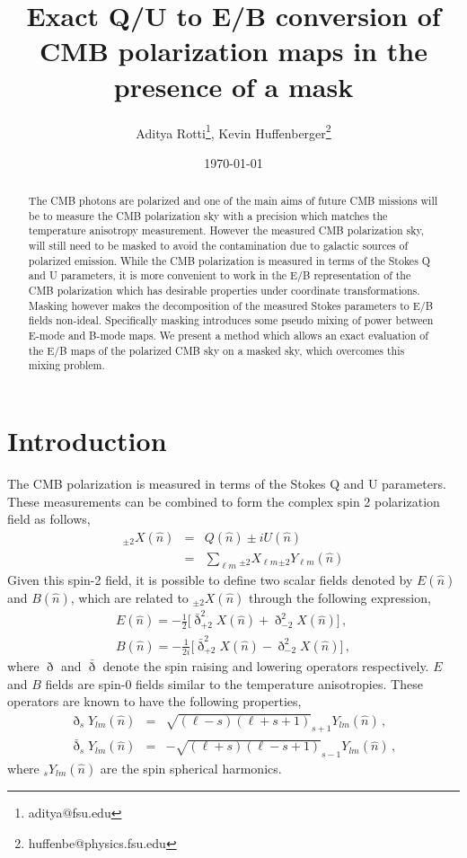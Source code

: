 \documentclass[prd,amsmath,amssymb,floatfix,nofootinbib,preprintnumbers,twocolumn]{revtex4}%
\newcommand{\beqry}{\begin{eqnarray}}
\newcommand{\eeqry}{\end{eqnarray}}
\begin{document}
\title{Exact Q/U to E/B conversion of CMB polarization maps in the presence of a mask}
\author{Aditya Rotti\footnote{aditya@fsu.edu}, Kevin Huffenberger\footnote{huffenbe@physics.fsu.edu}}

\date{\today}

\begin{abstract}
The CMB photons are polarized and one of the main aims of future CMB missions will be to measure the CMB polarization sky with a precision which matches the temperature anisotropy measurement. However the measured CMB polarization sky, will still need to be masked to avoid the contamination due to galactic sources of polarized emission. While the CMB polarization is measured in terms of the Stokes Q and U parameters, it is more convenient to work in the E/B representation of the CMB polarization which has desirable properties under coordinate transformations. Masking however makes the decomposition of the measured Stokes parameters to E/B fields non-ideal. Specifically masking introduces some pseudo mixing of power between E-mode and B-mode maps. We present a method which allows an exact evaluation of the E/B maps of the polarized CMB sky on a masked sky, which overcomes this mixing problem.
\end{abstract}

\maketitle



\section{Introduction}

The CMB polarization is measured in terms of the Stokes Q and U parameters. These measurements can be combined to form the complex spin 2 polarization field as follows,
%
\beqry
_{\pm 2}X(\hat{n}) &=& Q(\hat{n}) \pm i U (\hat{n}) \nonumber \\ 
                                 &=& \sum_{\ell m}  {_{\pm 2}}X_{\ell m}  {_{\pm 2}}Y_{\ell m} (\hat{n})
\eeqry
%
Given this spin-2 field, it is possible to define two scalar fields denoted by $E(\hat{n}) $ and $B(\hat{n}) $, which are related to $_{\pm 2}X(\hat{n})$ through the following expression,
%
\beqry \label{ebdef}
E(\hat{n}) = -\frac{1}{2} \big[ \bar{\eth}^2 _{+ 2}X(\hat{n})  +  \eth^2 _{- 2}X(\hat{n}) \big] \,, \\
B(\hat{n}) = -\frac{1}{2i} \big[ \bar{\eth}^2 _{+ 2}X(\hat{n})  -  \eth^2 _{- 2}X(\hat{n}) \big] \,,
\eeqry
%
where $\eth$ and $\bar{\eth}$ denote the spin raising and lowering operators respectively. $E$ and $B$ fields are spin-0 fields similar to the temperature anisotropies. These operators are known to have the following properties,
%
\beqry \label{spinopylm}
\eth _s Y_{lm}(\hat{n}) &=& \sqrt{(\ell-s)(\ell+s+1)} _{s+1} Y_{lm}(\hat{n}) \,, \\
\bar{\eth} _s Y_{lm}(\hat{n}) &=& -\sqrt{(\ell+s)(\ell-s+1)} _{s-1} Y_{lm}(\hat{n}) \,, 
\eeqry
%
where $_s Y_{lm}(\hat{n}) $ are the spin spherical harmonics.
\end{document}
